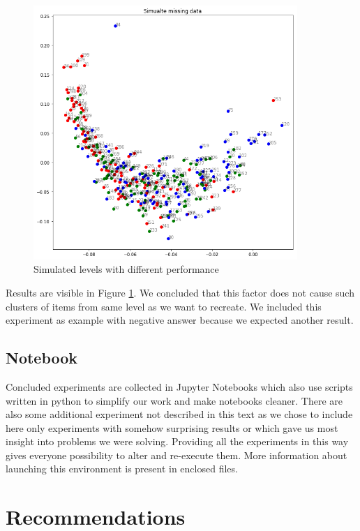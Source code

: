 \documentclass[
  digital, %
  table,   %
  nolof,     %
  nolot,     %
  nocover,
  color,
  final, %
]{fithesis3}
\begin{document}
\begin{figure}
  \includegraphics[width=10cm]{img/simulated_performance}
  \caption{Simulated levels with different performance}
  \label{fig:simulated_performance}
\end{figure}


Results are visible in Figure \ref{fig:simulated_performance}. We concluded that this factor does not cause such clusters of items from same level as we want to recreate. We included this experiment as example with negative answer because we expected another result.


\section{Notebook}\label{notebook}

Concluded experiments are collected in Jupyter Notebooks which also use scripts written in python to simplify our work and make notebooks cleaner. There are also some additional experiment not described in this text as we chose to include here only experiments with somehow surprising results or which gave us most insight into problems we were solving. Providing all the experiments in this way gives everyone possibility to alter and re-execute them. More information about launching this environment is present in enclosed files.

\chapter{Recommendations}\label{recommendations}
\end{document}
